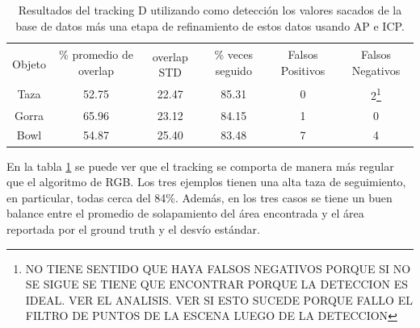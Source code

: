 \begin{table}
    \begin{tabular}{|c|c|c|c|c|c|}
    \hline
    & \multirow{2}{2.4cm}{\% promedio de overlap} & & \multirow{2}{2cm}{\% veces seguido} & \multirow{2}{1.6cm}{Falsos Positivos} & \multirow{2}{1.6cm}{Falsos Negativos}\\
	Objeto & & overlap STD & & &\\
    \hline
    Taza   & 52.75      & 22.47       & 85.31             & 0                & 2\footnote{NO TIENE SENTIDO QUE HAYA FALSOS NEGATIVOS PORQUE SI NO SE SIGUE SE TIENE QUE ENCONTRAR PORQUE LA DETECCION ES IDEAL. VER EL ANALISIS. VER SI ESTO SUCEDE PORQUE FALLO EL FILTRO DE PUNTOS DE LA ESCENA LUEGO DE LA DETECCION}\\
    \hline
    Gorra  & 65.96      & 23.12       & 84.15             & 1                & 0\\
    \hline
    Bowl   & 54.87      & 25.40       & 83.48             & 7                & 4\\
    \hline
    \end{tabular}
\caption{Resultados del tracking D utilizando como detección los valores sacados de la base de datos más una etapa de refinamiento de estos datos usando AP e ICP.}
\label{tabla_d}
\end{table}

En la tabla \ref{tabla_d} se puede ver que el tracking se comporta de manera más regular que el algoritmo de RGB. Los tres ejemplos tienen una alta taza de seguimiento, en particular, todas cerca del 84\%. Además, en los tres casos se tiene un buen balance entre el promedio de solapamiento del área encontrada y el área reportada por el ground truth y el desvío estándar.

